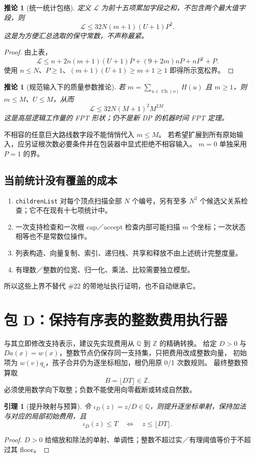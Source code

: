 \documentclass[UTF8,a4paper,11pt]{ctexart}
\newtheorem{lemma}[theorem]{引理}
\newtheorem{corollary}[theorem]{推论}
\theoremstyle{definition}
\newcommand{\Z}{\mathbb Z}
\newcommand{\Q}{\mathbb Q}
\newcommand{\ch}{\operatorname{Ch}}
\begin{document}
\begin{corollary}[统一统计包络]
定义 $\mathcal L$ 为前十五项累加字段之和，\emph{不包含两个最大值字段}，则
\[
 \boxed{\mathcal L\le32N(m+1)(U+1)P^2.}
\]
这是为方便汇总选取的保守常数，不声称最紧。
\end{corollary}
\begin{proof}
由上表，
\[
 \mathcal L\le n+2n(m+1)(U+1)P+(9+2m)nP+nP^2+P.
\]
使用 $n\le N$、$P\ge1$、$(m+1)(U+1)\ge m+1\ge1$ 即得所示宽松界。
\end{proof}

\begin{corollary}[规范输入下的质量参数推论]
若 $m=\sum_{u\in\ch(o)}H(u)$ 且 $m\ge1$，则 $m\le M$、$U\le M$，从而
\[
 \mathcal L\le32N(M+1)^2M^{2M}.
\]
这是高层逻辑工作量的 FPT 形状；仍不是新 DP 的机器时间 FPT 定理。
\end{corollary}
不相容的任意巨大路线数字段不能悄悄代入 $m\le M$。
若希望扩展到所有原始输入，应另证根次数必要条件并在包装器中显式拒绝不相容输入。
$m=0$ 单独采用 $P=1$ 的界。

\subsection{当前统计没有覆盖的成本}
\begin{enumerate}
\item \texttt{childrenList} 对每个顶点扫描全部 $N$ 个编号，另有至多 $N^2$ 个候选父关系检查；它不在现有十七项统计中。
\item 一次支持检查和一次根 cap／accept 检查内部可能扫描 $m$ 个坐标；一次状态相等也不是常数位操作。
\item 列表构造、向量复制、索引、递归栈、共享和释放不由上述统计完整度量。
\item 有理数／整数的位宽、归一化、乘法、比较需要独立模型。
\end{enumerate}
所以这些上界不替代 \#22 的带地址执行证明，也不自动继承它。

\section{包 D：保持有序表的整数费用执行器}

与其立即修改支持表示，建议先实现费用从 $\Q$ 到 $\Z$ 的精确转换。
给定 $D>0$ 与 $Da(x)=w(x)$，整数节点仍保存同一支持集，只把费用改成整数向量，
初始项为 $w(v)q_i$，孩子合并仍为逐坐标相加，根仍用原 0/1 次数规则。
最终整数预算取
\[
 B=\lfloor DT\rfloor\in\Z.
\]
必须使用数学向下取整；负数不能使用向零截断或转成自然数。

\begin{lemma}[提升映射与预算]
令 $\iota_D(z)=z/D\in\Q$，则提升逐坐标单射，保持加法与对应的局部初始费用，且
\[
 \iota_D(z)\le T\quad\Longleftrightarrow\quad z\le\lfloor DT\rfloor.
\]
\end{lemma}
\begin{proof}
$D>0$ 给缩放和除法的单射、单调性；整数不超过实／有理阈值等价于不超过其 floor。
\end{proof}
\end{document}
